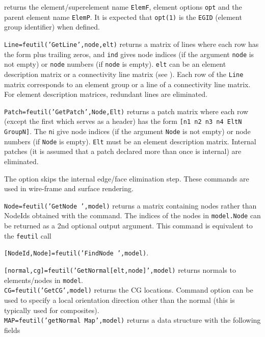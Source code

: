 \noindent returns the element/superelement name {\tt ElemF}, element options {\tt opt} and the parent element name {\tt ElemP}. It is expected that {\tt opt(1)} is the {\tt EGID} (element group identifier) when defined.


{\tt Line=feutil('GetLine',node,elt)} returns a matrix of lines where each row has the form plus trailing zeros, and {\tt ind}  gives node indices (if the argument {\tt node} is not empty) or {\tt node} numbers (if {\tt node} is empty). {\tt elt} can be an element description matrix or a connectivity line matrix (see \feplot).  Each row of the {\tt Line} matrix corresponds to an element group or a line of a connectivity line matrix. For element description matrices, redundant lines are eliminated.

{\tt Patch=feutil('GetPatch',Node,Elt)} returns a patch matrix where each row (except the first which serves as a header) has the form {\tt [n1 n2 n3 n4 EltN GroupN]}.  The {\tt n}{\ti i} give node indices (if the argument {\tt Node} is not empty) or node numbers (if {\tt Node} is empty).  {\tt Elt} must be an element description matrix.  Internal patches (it is assumed that a patch declared more than once is internal) are eliminated.

 The  option skips the internal edge/face elimination step. 
These commands are used in wire-frame and surface rendering.


{\tt Node=feutil('GetNode ',model)} returns a matrix containing nodes rather than NodeIds obtained with the  command. The indices of the nodes in {\tt model.Node} can be returned as a 2nd optional output argument.
This command is equivalent to the {\tt feutil} call 

{\tt [NodeId,Node]=feutil('FindNode ',model)}.


{\tt [normal,cg]=feutil('GetNormal[elt,node]',model)} returns normals to elements/nodes in {\tt model}.\\
{\tt CG=feutil('GetCG',model)} returns the CG locations. Command option  can be used to specify a local orientation direction other than the normal (this is typically used for composites).\\
{\tt MAP=feutil('getNormal Map',model)} returns a data structure with the following fields

